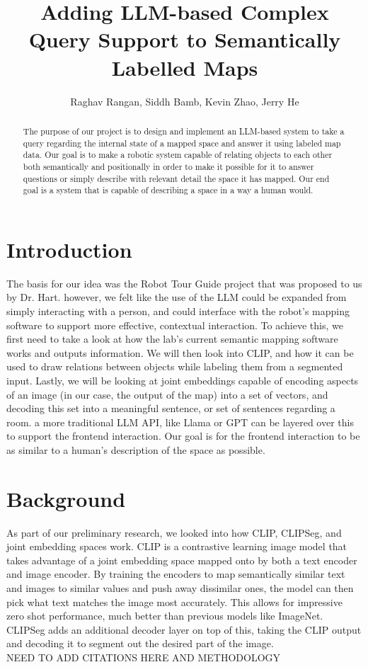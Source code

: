 \documentclass[letterpaper, 10 pt, conference]{ieeeconf}  %
\title{\LARGE \bf
Adding LLM-based Complex Query Support to Semantically Labelled Maps}
\author{Raghav Rangan, Siddh Bamb, Kevin Zhao, Jerry He%
}
\begin{document}
\maketitle
\thispagestyle{empty}
\pagestyle{empty}


\begin{abstract}
    The purpose of our project is to design and implement an LLM-based system to take a query regarding the internal state of a mapped space and answer it using labeled map data. Our goal is to make a robotic system capable of relating objects to each other both semantically and positionally in order to make it possible for it to answer questions or simply describe with relevant detail the space it has mapped. Our end goal is a system that is capable of describing a space in a way a human would.
\end{abstract}
    
\section{Introduction}
    The basis for our idea was the Robot Tour Guide project that was proposed to us by Dr. Hart. however, we felt like the use of the LLM could be expanded from simply interacting with a person, and could interface with the robot's mapping software to support more effective, contextual interaction. To achieve this, we first need to take a look at how the lab's current semantic mapping software works and outputs information. We will then look into CLIP, and how it can be used to draw relations between objects while labeling them from a segmented input. Lastly, we will be looking at joint embeddings capable of encoding aspects of an image (in our case, the output of the map) into a set of vectors, and decoding this set into a meaningful sentence, or set of sentences regarding a room. a more traditional LLM API, like Llama or GPT can be layered over this to support the frontend interaction. Our goal is for the frontend interaction to be as similar to a human's description of the space as possible.

\section{Background}
    As part of our preliminary research, we looked into how CLIP, CLIPSeg, and joint embedding spaces work. CLIP is a contrastive learning image model that takes advantage of a joint embedding space mapped onto by both a text encoder and image encoder. By training the encoders to map semantically similar text and images to similar values and push away dissimilar ones, the model can then pick what text matches the image most accurately. This allows for impressive zero shot performance, much better than previous models like ImageNet. CLIPSeg adds an additional decoder layer on top of this, taking the CLIP output and decoding it to segment out the desired part of the image.
    \\
    NEED TO ADD CITATIONS HERE AND METHODOLOGY
\end{document}
